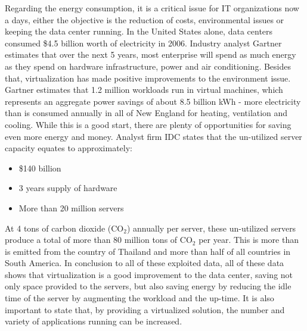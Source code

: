                 Regarding the energy consumption, it is a critical issue for IT organizations now a days, either the objective is the reduction of costs, environmental issues or keeping the data center running. In the United States alone, data centers consumed \$4.5 billion worth of electricity in 2006. Industry analyst Gartner \cite{GartnetKumar07} estimates that over the next 5 years, most enterprise will spend as much energy as they spend on hardware infrastructure, power and air conditioning. Besides that, virtualization has made positive improvements to the environment issue. Gartner \cite{GartnetStamford07} estimates that 1.2 million workloads run in virtual machines, which represents an aggregate power savings of about 8.5 billion kWh - more electricity than is consumed annually in all of New England for heating, ventilation and cooling. While this is a good start, there are plenty of opportunities for saving even more energy and money. Analyst firm IDC \cite{IDCDoc07} states that the un-utilized server capacity equates to approximately:
                \begin{itemize}
                    \item \$140 billion
                    \item 3 years supply of hardware
                    \item More than 20 million servers 
                \end{itemize}
                At 4 tons of carbon dioxide (CO$_{2}$) annually per server, these un-utilized servers produce a total of more than 80 million tons of CO$_{2}$ per year. This is more than is emitted from the country of Thailand and more than half of all countries in South America. In conclusion to all of these exploited data, all of these data shows that virtualization is a good improvement to the data center, saving not only space provided to the servers, but also saving energy by reducing the idle time of the server by augmenting the workload and the up-time. It is also important to state that, by providing a virtualized solution, the number and variety of applications running can be increased.
                
